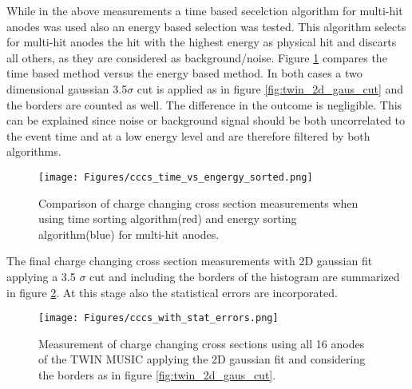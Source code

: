 While in the above measurements a time based secelction algorithm for multi-hit anodes was used also an energy based selection was tested. This algorithm selects for multi-hit anodes the hit with the highest energy as physical hit and discarts all others, as they are considered as background/noise. Figure \ref{fig:cccs_gaus_time_vs_energy} compares the time based method versus the energy based method. In both cases a two dimensional gaussian 3.5$\sigma$ cut is applied as in figure \ref{fig:twin_2d_gaus_cut} and the borders are counted as well. The difference in the outcome is negligible. This can be explained since noise or background signal should be both uncorrelated to the event time and at a low energy level and are therefore filtered by both algorithms.
\begin{figure}[htpb]
    \centering
    \texttt{[image: Figures/cccs\_time\_vs\_engergy\_sorted.png]}
    \caption{
    Comparison of charge changing cross section measurements when using time sorting algorithm(red) and energy sorting algorithm(blue) for multi-hit anodes.
     }
    \label{fig:cccs_gaus_time_vs_energy}
\end{figure}
The final charge changing cross section measurements with 2D gaussian fit applying a 3.5 $\sigma$ cut and including the borders of the histogram are summarized in figure \ref{fig:cccs_gaus_with_errors}. At this stage also the statistical errors are incorporated. 
\begin{figure}[htpb]
    \centering
    \texttt{[image: Figures/cccs\_with\_stat\_errors.png]}
    \caption{
    Measurement of charge changing cross sections using all 16 anodes of the TWIN MUSIC applying the 2D gaussian fit and considering the borders as in figure \ref{fig:twin_2d_gaus_cut}.
     }
    \label{fig:cccs_gaus_with_errors}
\end{figure}

\newpage
%	
